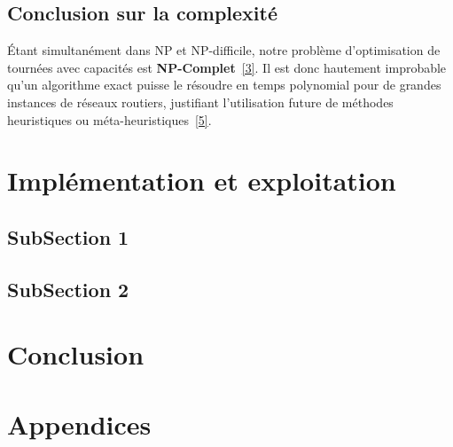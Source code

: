 \subsection{Conclusion sur la complexité}

Étant simultanément dans NP et NP-difficile, notre problème d'optimisation de tournées avec capacités est \textbf{NP-Complet}~\hyperlink{ref:garey1979}{[3]}. Il est donc hautement improbable qu'un algorithme exact puisse le résoudre en temps polynomial pour de grandes instances de réseaux routiers, justifiant l'utilisation future de méthodes heuristiques ou méta-heuristiques~\hyperlink{ref:toth2014}{[5]}.

\newpage

\section{Implémentation et exploitation}

\subsection*{SubSection 1}

\subsection*{SubSection 2}

\newpage

\section*{Conclusion}

\newpage

\section*{Appendices}

\newpage

